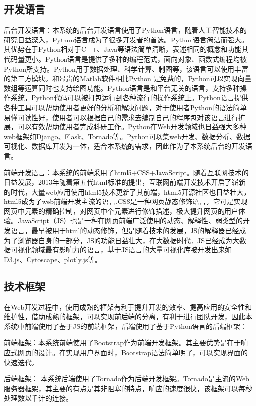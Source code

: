 \subsection{开发语言}
后台开发语言：本系统的后台开发语言使用了Python语言，随着人工智能技术的研究日益深入，Python语言成为了很多开发者的首选。Python语言简洁而强大。其优势在于Python相对于C++、Java等语法简单清晰，表述相同的概念和功能其代码量更小。Python语言是提供了多种的编程范式，面向对象、函数式编程均被Python所支持。Python用于数据处理、科学计算、制图等，该语言可以使用丰富的第三方模块。和昂贵的Matlab软件相比Python 是免费的，Python可以实现向量数组等运算同时也支持绘图功能。Python语言是和平台无关的语言，支持多种操作系统，Python代码可以被打包运行到各种流行的操作系统上。Python语言提供各种工具可以帮助使用者更好的分析和解决问题，对于使用者Python的语法简单易懂可读性好，使用者可以根据自己的需求去编制自己的程序包对该语言进行扩展，可以有效帮助使用者完成科研工作。Python在Web开发领域也日益强大多种web框架如Django、Flask、Tornado等。Python可以集web开发、数据分析、数据可视化、数据库开发为一体，适合本系统的需求，因此作为了本系统后台的开发语言。

前端开发语言：本系统的前端采用了html5+CSS+JavaScript。随着互联网技术的日益发展，2013年随着第五代html标准的提出，互联网前端开发技术开启了崭新的时代，大量web应用使用html5技术更新了其前端，html5开源社区也日益壮大，html5成为了web前端开发主流的语言.CSS是一种网页静态修饰语言，它可是实现网页中元素的精确控制，对网页中个元素进行修饰描述，极大提升网页的用户体验。JavaScript（JS）也是一种在网页前端广泛使用的动态、解释性、弱类型的开发语言，最早被用于html的动态修饰，但是随着技术的发展，JS的解释器已经成为了浏览器自身的一部分，JS的功能日益壮大，在大数据时代，JS已经成为大数据可视化领域最有影响力的语言，基于JS语言的大量可视化库被开发出来如D3.js、Cytoscape、plotly.js等。

\subsection{技术框架}
在Web开发过程中，使用成熟的框架有利于提升开发的效率、提高应用的安全性和维护性，借助成熟的框架，可以实现前后端的分离，有利于进行团队开发，因此本系统中前端使用了基于JS的前端框架，后端使用了基于Python语言的后端框架：

前端框架：本系统前端使用了Bootstrap作为前端开发框架。其主要优势是在于响应式网页的设计。在实现用户界面时，Bootstrap语法简单明了，可以实现界面的快速迭代。

后端框架： 本系统后端使用了Tornado作为后端开发框架。Tornado是主流的Web服务器框架，其主要的有点是其非阻塞的特点，响应的速度很快，该框架可以每秒处理数以千计的连接。



